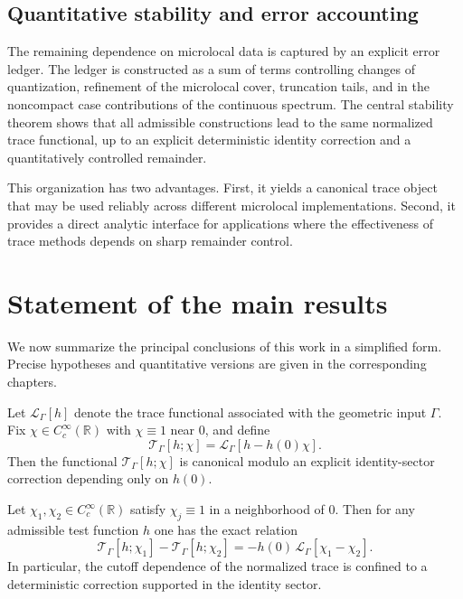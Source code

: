 \subsection{Quantitative stability and error accounting}
\label{subsec:01.approach.ledger}

The remaining dependence on microlocal data is captured by an explicit error ledger.
The ledger is constructed as a sum of terms controlling changes of quantization, refinement of the microlocal cover,
truncation tails, and in the noncompact case contributions of the continuous spectrum.
The central stability theorem shows that all admissible constructions lead to the same normalized trace functional,
up to an explicit deterministic identity correction and a quantitatively controlled remainder.

This organization has two advantages.
First, it yields a canonical trace object that may be used reliably across different microlocal implementations.
Second, it provides a direct analytic interface for applications where the effectiveness of trace methods depends on
sharp remainder control.

\section{Statement of the main results}
\label{sec:01.main-results}

We now summarize the principal conclusions of this work in a simplified form.
Precise hypotheses and quantitative versions are given in the corresponding chapters.

\begin{theorem}
\label{thm:01.canonical-trace}
Let $\mathcal{L}_\Gamma[h]$ denote the trace functional associated with the geometric input $\Gamma$.
Fix $\chi\in C_c^\infty(\mathbb{R})$ with $\chi\equiv 1$ near $0$, and define
\[
\mathcal{T}_\Gamma[h;\chi]
=
\mathcal{L}_\Gamma[h-h(0)\chi].
\]
Then the functional $\mathcal{T}_\Gamma[h;\chi]$ is canonical modulo an explicit identity-sector correction depending
only on $h(0)$.
\end{theorem}

\begin{theorem}
\label{thm:01.cutoff-change}
Let $\chi_1,\chi_2\in C_c^\infty(\mathbb{R})$ satisfy $\chi_j\equiv 1$ in a neighborhood of $0$.
Then for any admissible test function $h$ one has the exact relation
\[
\mathcal{T}_\Gamma[h;\chi_1]-\mathcal{T}_\Gamma[h;\chi_2]
=
-h(0)\,\mathcal{L}_\Gamma[\chi_1-\chi_2].
\]
In particular, the cutoff dependence of the normalized trace is confined to a deterministic correction supported in
the identity sector.
\end{theorem}

